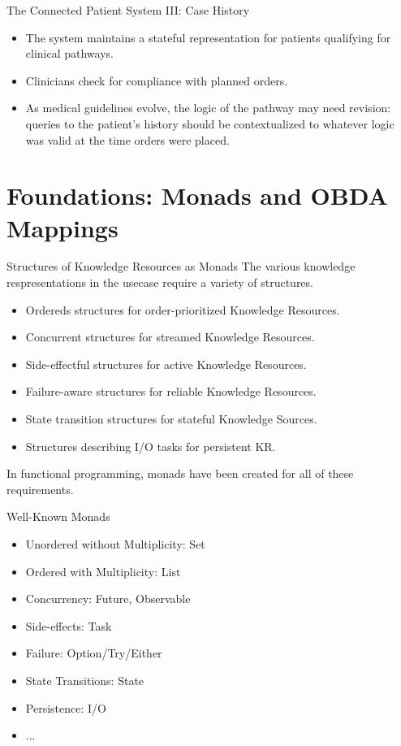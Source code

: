 \documentclass{beamer}
\begin{document}
  
\begin{frame}{The Connected Patient System III: Case History}
  \begin{itemize}
  \item The system maintains a stateful representation for patients qualifying for clinical pathways.
  \item Clinicians check for compliance with planned orders.
  \item As medical guidelines evolve, the logic of the pathway may need revision: queries to the patient's history should be contextualized to whatever logic was valid at the time orders were placed.
  \end{itemize}
\end{frame}




\section{Foundations: Monads and OBDA Mappings}

\begin{frame}{Structures of Knowledge Resources as Monads}
  The various knowledge respresentations in the usecase require a variety of structures.
  \begin{itemize}
  \item {Ordereds structures for order-prioritized Knowledge Resources.}
  \item {Concurrent structures for streamed Knowledge Resources.}
  \item {Side-effectful structures for active Knowledge Resources.
  }
  \item {Failure-aware structures for reliable Knowledge Resources.
  }
  \item {State transition structures for stateful Knowledge Sources.
  }
  \item {Structures describing I/O tasks for persistent KR.
  }
  \end{itemize}
  In functional programming, monads have been created for all of these requirements.
\end{frame}

\begin{frame}{Well-Known Monads}
  \begin{itemize}
  \item Unordered without Multiplicity: Set
  \item Ordered with Multiplicity: List
  \item Concurrency: Future, Observable
  \item Side-effects: Task
  \item Failure: Option/Try/Either
  \item State Transitions: State
  \item Persistence: I/O
  \item ...
  \end{itemize}
\end{frame}
\end{document}

